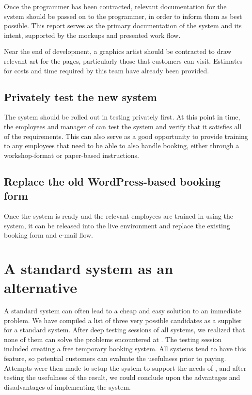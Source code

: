 Once the programmer has been contracted, relevant documentation for the system
should be passed on to the programmer, in order to inform them as best possible.
This report serves as the primary documentation of the system and its intent,
supported by the mockups and presented work flow.

Near the end of development, a graphics artist should be contracted to draw
relevant art for the pages, particularly those that customers can visit.
Estimates for costs and time required by this team have already been provided.

\subsection{Privately test the new system}
The system should be rolled out in testing privately first. At this point in
time, the employees and manager of \gomonkey{} can test the system and verify
that it satisfies all of the requirements. This can also serve as a good
opportunity to provide training to any employees that need to be able to also
handle booking, either through a workshop-format or paper-based instructions.

\subsection{Replace the old WordPress-based booking form}
Once the system is ready and the relevant employees are trained in using the
system, it can be released into the live environment and replace the existing
booking form and e-mail flow.

\newpage
\section{A standard system as an alternative}
A standard system can often lead to a cheap and easy solution to an immediate
problem.  We have compiled a list of three very possible candidates as a
supplier for a standard system.  After deep testing sessions of all systems, we
realized that none of them can solve the problems encountered at \gomonkey{}.
The testing session included creating a free temporary booking system. All
systems tend to have this feature, so potential customers can evaluate the
usefulness prior to paying. Attempts were then made to setup the system to
support the needs of \gomonkey{}, and after testing the usefulness of the
result, we could conclude upon the advantages and disadvantages of implementing
the system.

